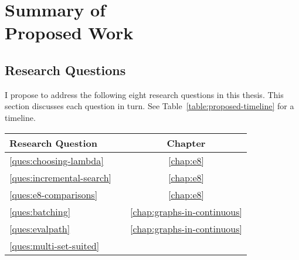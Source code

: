 \chapter[Summary of Proposed Work]{Summary of\\Proposed Work}
\label{chap:proposed}

\section{Research Questions}
\label{sec:research-questions}

I propose to address the following eight research questions
in this thesis.
This section discusses each question in turn.
See Table~\ref{table:proposed-timeline} for a timeline.

\begin{center}
\begin{tabular}{llc}
\toprule
   \multicolumn{2}{l}{Research Question}
      & Chapter \\
\midrule
   \ref{ques:choosing-lambda}
      &
      \begin{minipage}[c]{0.75\columnwidth}%
      \nameref{ques:choosing-lambda}
      \end{minipage}%
      & \ref{chap:e8} \\[12pt]
   \ref{ques:incremental-search}
      &
      \begin{minipage}[c]{0.75\columnwidth}%
      \nameref{ques:incremental-search}
      \end{minipage}%
      & \ref{chap:e8} \\[12pt]
   \ref{ques:e8-comparisons}
      &
      \begin{minipage}[c]{0.75\columnwidth}%
      \nameref{ques:e8-comparisons}
      \end{minipage}%
      & \ref{chap:e8} \\[12pt]
   \ref{ques:batching}
      &
      \begin{minipage}[c]{0.75\columnwidth}%
      \nameref{ques:batching}
      \end{minipage}%
      & \ref{chap:graphs-in-continuous} \\[12pt]
   \ref{ques:evalpath}
      &
      \begin{minipage}[c]{0.75\columnwidth}%
      \nameref{ques:evalpath}
      \end{minipage}%
      & \ref{chap:graphs-in-continuous} \\[12pt]
   \ref{ques:multi-set-suited}
      &
      \begin{minipage}[c]{0.75\columnwidth}%

\end{minipage}
\end{tabular}
\end{center}
